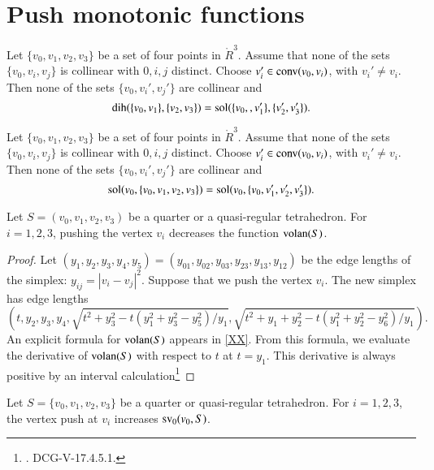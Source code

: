 \section{Push monotonic functions}


\begin{lemma}
Let $\{v_0,v_1,v_2,v_3\}$ be a set of four points in $\ring{R}^3$.
Assume that none of the sets $\{v_0,v_i,v_j\}$ is collinear with
$0,i,j$ distinct.   Choose
$v'_i\in{\operatorname{conv}}(v_0,v_i)$, with $v_i'\ne v_i$.  Then
none of the sets $\{v_0,v_i',v_j'\}$ are collinear and
  $$\operatorname{dih}(\{v_0,v_1\},\{v_2,v_3\}) = \operatorname{sol}(\{v_0,,v'_1\},\{v'_2,v'_3\}).$$
\end{lemma}

\begin{lemma}
Let $\{v_0,v_1,v_2,v_3\}$ be a set of four points in $\ring{R}^3$.
Assume that none of the sets $\{v_0,v_i,v_j\}$ is collinear with
$0,i,j$ distinct.   Choose
$v'_i\in{\operatorname{conv}}(v_0,v_i)$, with $v_i'\ne v_i$.  Then
none of the sets $\{v_0,v_i',v_j'\}$ are collinear and
  $$\operatorname{sol}(v_0,\{v_0,v_1,v_2,v_3\}) = \operatorname{sol}(v_0,\{v_0,v'_1,v'_2,v'_3\}).$$
\end{lemma}


\begin{lemma}  
Let $S= (v_0,v_1,v_2,v_3)$ be a quarter
or a quasi-regular tetrahedron.  For  $i=1,2,3$,
pushing the vertex $v_i$ decreases the function ${\operatorname{volan}}(S)$.
\end{lemma}

\begin{proof}  
Let $(y_1,y_2,y_3,y_4,y_5) = (y_{01},y_{02},y_{03},y_{23},y_{13},y_{12})$ 
be the edge lengths of the simplex: $y_{ij} = |v_i-v_j|^2$.
Suppose that we push the vertex $v_i$.  The new simplex has edge
lengths
$$
\left(t,y_2,y_3,y_4,\sqrt{t^2+y_3^2 - t(y_1^2+y_3^2-y_5^2)/y_1},
\sqrt{t^2 + y_1 + y_2^2 - t(y_1^2+y_2^2-y_6^2)/y_1}\right).
$$
An explicit formula for ${\operatorname{volan}}(S)$ appears in
\ref{XX}.  From this formula, 
we evaluate the derivative of ${\operatorname{volan}}(S)$ with respect
to $t$ at $t=y_1$.   This derivative is always positive by
an interval calculation\footnote{.  DCG-V-17.4.5.1.}
\end{proof}

\begin{lemma}
Let $S=\{v_0,v_1,v_2,v_3\}$ be a quarter or quasi-regular tetrahedron.
For $i=1,2,3$, the vertex push at $v_i$ increases
${\operatorname{sv}}_0(v_0,S)$.
\end{lemma}

